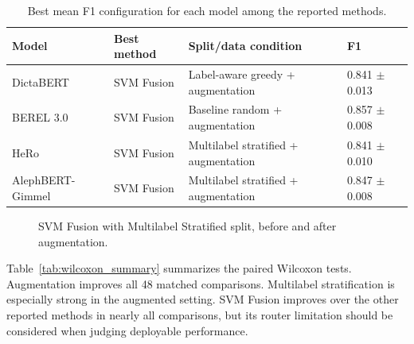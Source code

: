 \documentclass[11pt,a4paper]{article}
\begin{document}
\begin{table}[htbp]
\centering
\small
\caption{Best mean F1 configuration for each model among the reported methods.}
\label{tab:best_by_model}
\begin{tabular}{llll}
\toprule
Model & Best method & Split/data condition & F1 \\
\midrule
DictaBERT & SVM Fusion & Label-aware greedy + augmentation & 0.841 $\pm$ 0.013 \\
BEREL 3.0 & SVM Fusion & Baseline random + augmentation & 0.857 $\pm$ 0.008 \\
HeRo & SVM Fusion & Multilabel stratified + augmentation & 0.841 $\pm$ 0.010 \\
AlephBERT-Gimmel & SVM Fusion & Multilabel stratified + augmentation & 0.847 $\pm$ 0.008 \\
\bottomrule
\end{tabular}
\end{table}

\begin{figure}[htbp]
\centering
{}
\caption{SVM Fusion with Multilabel Stratified split, before and after augmentation.}
\label{fig:journal_svm}
\end{figure}

Table~\ref{tab:wilcoxon_summary} summarizes the paired Wilcoxon tests. Augmentation improves all 48 matched comparisons. Multilabel stratification is especially strong in the augmented setting. SVM Fusion improves over the other reported methods in nearly all comparisons, but its router limitation should be considered when judging deployable performance.
\end{document}
